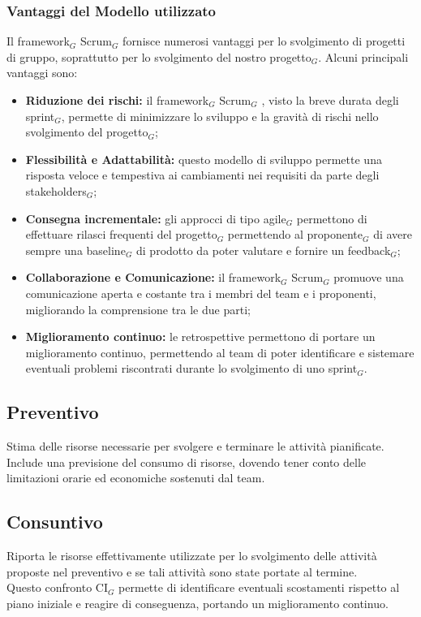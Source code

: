 \documentclass[10pt]{article}
\begin{document}
{\subsubsection{Vantaggi del Modello utilizzato}
Il framework$_G$ Scrum$_G$ fornisce numerosi vantaggi per lo svolgimento di progetti di gruppo, soprattutto per lo svolgimento del nostro progetto$_G$. Alcuni principali vantaggi sono:
\begin{itemize}
  \item \textbf{Riduzione dei rischi:} il framework$_G$ Scrum$_G$ , visto la breve durata degli sprint$_G$, permette di minimizzare lo sviluppo e la gravità di rischi nello svolgimento del progetto$_G$;
  \item \textbf{Flessibilità e Adattabilità:} questo modello di sviluppo permette una risposta veloce e tempestiva ai cambiamenti nei requisiti da parte degli stakeholders$_G$;
  \item \textbf{Consegna incrementale:} gli approcci di tipo agile$_G$ permettono di effettuare rilasci frequenti del progetto$_G$ permettendo al proponente$_G$ di avere sempre una baseline$_G$ di prodotto da poter valutare e fornire un feedback$_G$;
  \item \textbf{Collaborazione e Comunicazione:} il framework$_G$ Scrum$_G$ promuove una comunicazione aperta e costante tra i membri del team e i proponenti, migliorando la comprensione tra le due parti;
  \item \textbf{Miglioramento continuo:} le retrospettive permettono di portare un miglioramento continuo, permettendo al team di poter identificare e sistemare eventuali problemi riscontrati durante lo svolgimento di uno sprint$_G$.
\end{itemize}

\subsection{Preventivo}
Stima delle risorse necessarie per svolgere e terminare le attività pianificate. Include una previsione del consumo di risorse, dovendo tener conto delle limitazioni orarie ed economiche sostenuti dal team.
\subsection{Consuntivo}
Riporta le risorse effettivamente utilizzate per lo svolgimento delle attività proposte nel preventivo e se tali attività sono state portate al termine.\\
Questo confronto CI$_G$ permette di identificare eventuali scostamenti rispetto al piano iniziale e reagire di conseguenza, portando un miglioramento continuo.
\newpage
}
\end{document}

